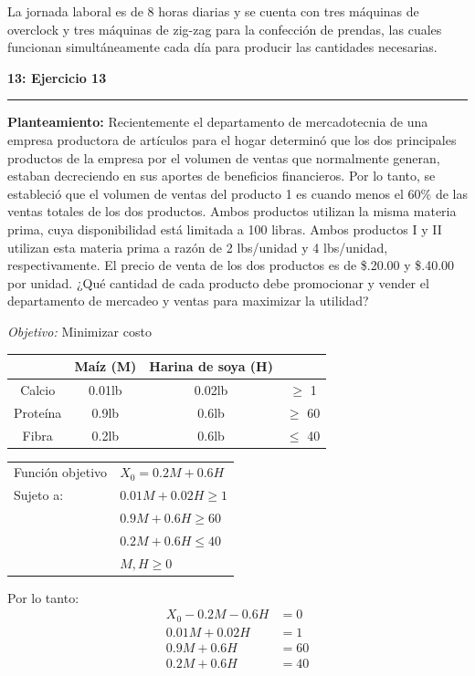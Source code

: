 \documentclass[11pt]{article}
\newcommand\problema[2]{\vspace{.01in}\textbf{#1: #2}\vspace{.5em}\hrule\vspace{.10in}}
\newcommand\planteamiento{\vspace{.10in}\textbf{Planteamiento: }}
\newcommand\obj{\vspace{.10in}\textit{Objetivo: }}
\begin{document}
La jornada laboral es de 8 horas diarias y se cuenta con tres máquinas de overclock y tres máquinas de zig-zag para la confección de prendas, las cuales funcionan simultáneamente cada día para producir las cantidades necesarias.

\pagebreak
\problema{13}{Ejercicio 13}
\planteamiento
Recientemente el departamento de mercadotecnia de una empresa productora de artículos para el hogar determinó que los dos principales productos de la empresa por el volumen de ventas que normalmente generan, estaban decreciendo en sus aportes de beneficios financieros. Por lo tanto, se estableció que el volumen de ventas del producto 1 es cuando menos el 60\% de las ventas totales de los dos productos. Ambos productos utilizan la misma materia prima, cuya disponibilidad está limitada a 100 libras. Ambos productos I y II utilizan esta materia prima a razón de 2 lbs/unidad y 4 lbs/unidad, respectivamente. El precio de venta de los dos productos es de \$.20.00 y \$.40.00 por unidad. ¿Qué cantidad de cada producto debe promocionar y vender el departamento de mercadeo y ventas para maximizar la utilidad?


\obj Minimizar costo

\begin{tabular}{|c|c|c|c|}
\hline 
 & Maíz (M) & Harina de soya (H) &  \\ 
\hline 
Calcio & 0.01lb & 0.02lb & $\geq$ 1 \\ 
\hline 
Proteína & 0.9lb & 0.6lb & $\geq$ 60 \\ 
\hline 
Fibra & 0.2lb & 0.6lb & $\leq$ 40 \\ 
\hline 
\end{tabular}

\begin{table}[h]
\begin{tabular}{ll}
Función objetivo & $X_0 = 0.2M+0.6H$    \\
Sujeto a:        & $0.01M + 0.02H \geq 1$ \\
                 & $0.9M + 0.6H \geq 60$ \\
                 & $0.2M + 0.6H \leq 40$ \\
                 & $M,H \geq 0$    
\end{tabular}
\end{table}

Por lo tanto:
\begin{align*}
X_0 - 0.2M - 0.6H &= 0\\
0.01M + 0.02H &= 1\\
0.9M + 0.6H &= 60\\
0.2M + 0.6H &= 40
\end{align*}
\end{document}
